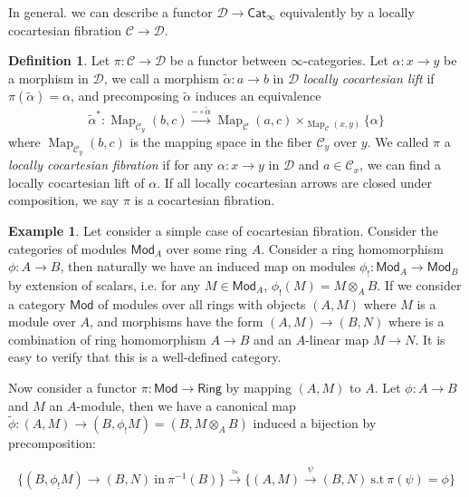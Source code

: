\documentclass[12pt]{amsart}
\theoremstyle{definition}
\newtheorem{example}[thm]{Example}
\newtheorem{defn}[thm]{Definition}
\theoremstyle{remark}
\numberwithin{equation}{section}
\newcommand{\1}{{\mathbb{1}}}
\newcommand{\Mod}{\mathsf{Mod}}
\newcommand{\ring}{\mathsf{Ring}}
\newcommand{\cat}{\mathsf{Cat}}
\newcommand{\map}{\operatorname{Map}}
\begin{document}
In general. we can describe a functor $\mathcal{D} \to \cat_{\infty}$ equivalently by a locally cocartesian fibration $\mathcal{C}\to \mathcal{D}$. 
\begin{defn}
	Let $\pi: \mathcal{C}\to \mathcal{D}$ be a functor between $\infty$-categories. Let $\alpha: x \to y$ be a morphism in $\mathcal{D}$, we call a morphism $\tilde{\alpha}: a\to b$ in $\mathcal{D}$ {\it locally cocartesian lift} if $\pi(\tilde{\alpha})= \alpha$, and precomposing  $\tilde{\alpha}$ induces an equivalence
	\begin{equation*}
	\tilde{\alpha}^*: \map_{\mathcal{C}_y}(b,c) \stackrel{-\circ \tilde{\alpha}}{\longrightarrow} \map_{\mathcal{C}}(a,c) \times_{\map_{\mathcal{C}}(x,y)} \{\alpha \}
	\end{equation*}
	where $\map_{\mathcal{C}_y}(b,c)$ is the mapping space in the fiber $\mathcal{C}_y$ over $y$. We called $\pi$ a {\it locally cocartesian fibration} if for any $\alpha: x\to y$ in $\mathcal{D}$ and $a\in \mathcal{C}_x$, we can find a locally cocartesian lift of $\alpha$. If all locally cocartesian arrows are closed under composition, we say $\pi$ is a cocartesian fibration.
\end{defn}


\begin{example}
	Let consider a simple case of cocartesian fibration. Consider the categories of modules $\Mod_A$ over some ring $A$. Consider a ring homomorphism $\phi: A\to B$, then naturally we have an induced map on modules $\phi_!: \Mod_A \to \Mod_B$ by extension of scalars, i.e. for any $M\in \Mod_A$, $\phi_!(M)= M\otimes_A B$. If we consider a category $\Mod$ of modules over all rings with objects $(A,M)$ where $M$ is a module over $A$, and morphisms have the form $(A,M) \to (B,N)$ where is a combination of ring homomorphism $A \to B$ and an $A$-linear map $M\to N$. It is easy to verify that this is a well-defined category. 
	
	Now consider a functor $\pi: \Mod\to \ring$ by mapping $(A,M)$ to $A$. Let $\phi: A\to B$ and $M$ an $A$-module, then we have a canonical map $\tilde{\phi}:(A,M)\to (B, \phi_!M)=(B, M\otimes_A B)$ induced a bijection by precomposition:
	
	\begin{equation*}
	\{(B,\phi_! M) \to (B,N)\ \text{in}\ \pi^{-1}(B)  \}\stackrel{\simeq}{\longrightarrow} \{(A,M)\stackrel{\psi}{\longrightarrow} (B,N)            \ \text{s.t}\ \pi(\psi)=\phi \}
	\end{equation*}
\end{example}
\end{document}
